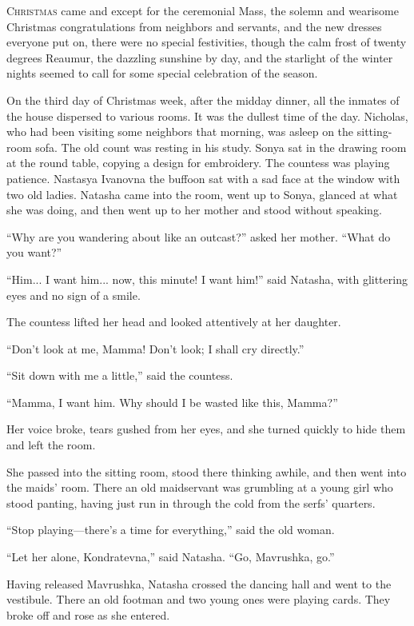 \lettrine[lines=2, loversize=0.3, lraise=0]{\initfamily C}{hristmas}
came and except for the ceremonial Mass, the solemn and
wearisome Christmas congratulations from neighbors and servants,
and the new dresses everyone put on, there were no special
festivities, though the calm frost of twenty degrees Reaumur, the
dazzling sunshine by day, and the starlight of the winter nights
seemed to call for some special celebration of the season.

On the third day of Christmas week, after the midday dinner, all
the inmates of the house dispersed to various rooms. It was the
dullest time of the day. Nicholas, who had been visiting some
neighbors that morning, was asleep on the sitting-room sofa. The
old count was resting in his study. Sonya sat in the drawing room
at the round table, copying a design for embroidery. The countess
was playing patience. Nastasya Ivanovna the buffoon sat with a
sad face at the window with two old ladies. Natasha came into the
room, went up to Sonya, glanced at what she was doing, and then
went up to her mother and stood without speaking.

``Why are you wandering about like an outcast?'' asked her
mother. ``What do you want?''

``Him... I want him... now, this minute! I want him!'' said
Natasha, with glittering eyes and no sign of a smile.

The countess lifted her head and looked attentively at her
daughter.

``Don't look at me, Mamma! Don't look; I shall cry directly.''

``Sit down with me a little,'' said the countess.

``Mamma, I want him. Why should I be wasted like this, Mamma?''

Her voice broke, tears gushed from her eyes, and she turned
quickly to hide them and left the room.

She passed into the sitting room, stood there thinking awhile,
and then went into the maids' room. There an old maidservant was
grumbling at a young girl who stood panting, having just run in
through the cold from the serfs' quarters.

``Stop playing---there's a time for everything,'' said the old
woman.

``Let her alone, Kondratevna,'' said Natasha. ``Go, Mavrushka,
go.''

Having released Mavrushka, Natasha crossed the dancing hall and
went to the vestibule. There an old footman and two young ones
were playing cards. They broke off and rose as she entered.

